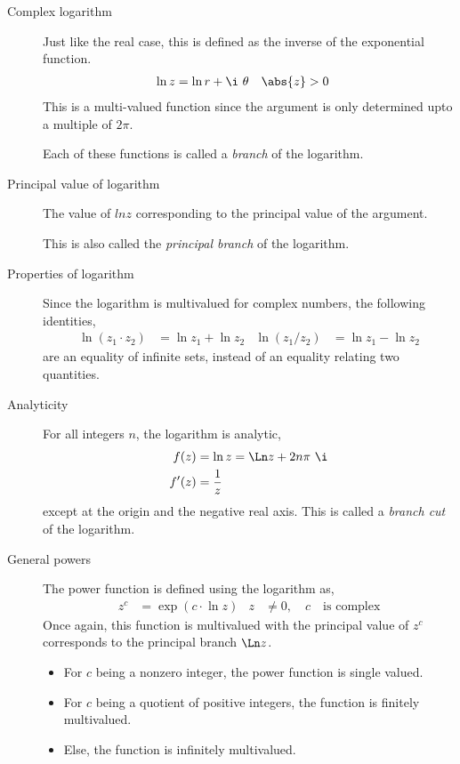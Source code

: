 \begin{description}
    \item[Complex logarithm] Just like the real case, this is defined as the inverse of
        the exponential function.
        \begin{align}
            \ln z   & = \ln r + \i\ \theta &
            \abs{z} & > 0
        \end{align}
        This is a multi-valued function since the argument is only determined upto a
        multiple of $ 2\pi $. \par
        Each of these functions is called a \emph{branch} of the logarithm.

    \item[Principal value of logarithm] The value of $ ln z $ corresponding to the
        principal value of the argument. \par
        This is also called the \emph{principal branch} of the logarithm.

    \item[Properties of logarithm] Since the logarithm is multivalued for complex
        numbers, the following identities,
        \begin{align}
            \ln(z_1 \cdot z_2) & = \ln z_1 + \ln z_2 &
            \ln(z_1 / z_2)     & = \ln z_1 - \ln z_2
        \end{align}
        are an equality of infinite sets, instead of an equality relating two quantities.

    \item[Analyticity] For all integers $ n $, the logarithm is analytic,
        \begin{align}
            f(z)  & = \ln z = \Ln z + 2n\pi\ \i \\
            f'(z) & = \frac{1}{z}
        \end{align}
        except at the origin and the negative real axis. This is called a
        \emph{branch cut} of the logarithm.

    \item[General powers] The power function is defined using the logarithm as,
        \begin{align}
            z^c & = \exp(c \cdot \ln z)                   &
            z   & \neq 0, \quad c \quad \text{is complex}
        \end{align}
        Once again, this function is multivalued with the principal value of $ z^c $
        corresponds to the principal branch $ \Ln z $. \par
        \begin{itemize}
            \item For $ c $ being a nonzero integer, the power function is single
                  valued. \par
            \item For $ c $ being a quotient of positive integers, the function is
                  finitely multivalued. \par
            \item Else, the function is infinitely multivalued.
        \end{itemize}
\end{description}